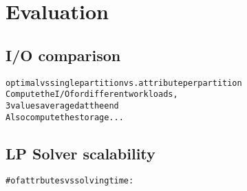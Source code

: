 \section{Evaluation}

\subsection{I/O comparison}
\begin{alltt}\scriptsize
optimal vs single partition vs. attribute per partition
Compute the I/O for different workloads,
3 values averaged at the end
Also compute the storage...
\end{alltt}

\subsection{LP Solver scalability}
\begin{alltt}\scriptsize
# of attrbutes vs solving time:
\end{alltt}

